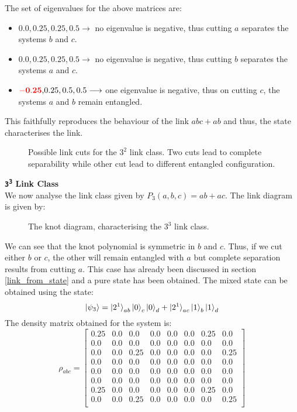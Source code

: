 \documentclass{scrartcl}
\begin{document}
    The set of eigenvalues for the above matrices are:
    \begin{itemize}
        \item $0.0, 0.25, 0.25, 0.5 \longrightarrow$ no eigenvalue is negative, thus cutting $a$ separates the systems $b$ and $c$.        
        \item $0.0, 0.25, 0.25, 0.5 \longrightarrow$ no eigenvalue is negative, thus cutting $b$ separates the systems $a$ and $c$.        
       \item $ \mathbf{\mathcolor{red}{-0.25},} 0.25, 0.5, 0.5 \longrightarrow$ one eigenvalue is negative, thus on cutting $c$, the systems $a$ and $b$ remain entangled.
    \end{itemize}
    This faithfully reproduces the behaviour of the link $abc+ab$ and thus, the state characterises the link.\begin{figure}
        \centering
        \scalebox{0.8}{ }
        \caption{Possible link cuts for the $3^2$ link class. Two cuts lead to complete separability while other cut lead to different entangled configuration.}
    \end{figure}
\textbf{\large \texttt{3\textsuperscript{3}} Link Class} \\[0.3cm]
We now analyse the link class given by $P_3(a,b,c) = ab+ac$. The link diagram is given by:
\begin{figure}[H]
    \centering
    
  \caption{The knot diagram, characterising the $3^3$ link class.}
\end{figure}
\noindent
We can see that the knot polynomial is symmetric in $b$ and $c$. Thus, if we cut either $b$ or $c$, the other will remain entangled with $a$ but complete separation results from cutting $a$. This case has already been discussed in section \ref{link_from_state} and a pure state has been obtained. The mixed state can be obtained using the state:
$$\ket{\psi_3} = \ket{2^1}_{ab}\ket{0}_c\ket{0}_d + \ket{2^1}_{ac}\ket{1}_b\ket{1}_d  $$ 
The density matrix obtained for the system is: 
\begin{equation*}
    \rho_{abc}=
    \left[
    \begin{array}{cccccccc}
    0.25 & 0.0 & 0.0 & 0.0 & 0.0 & 0.0 & 0.25 & 0.0 \\
    0.0 & 0.0 & 0.0 & 0.0 & 0.0 & 0.0 & 0.0 & 0.0 \\
    0.0 & 0.0 & 0.25 & 0.0 & 0.0 & 0.0 & 0.0 & 0.25 \\
    0.0 & 0.0 & 0.0 & 0.0 & 0.0 & 0.0 & 0.0 & 0.0 \\
    0.0 & 0.0 & 0.0 & 0.0 & 0.0 & 0.0 & 0.0 & 0.0 \\
    0.0 & 0.0 & 0.0 & 0.0 & 0.0 & 0.0 & 0.0 & 0.0 \\
    0.25 & 0.0 & 0.0 & 0.0 & 0.0 & 0.0 & 0.25 & 0.0 \\
    0.0 & 0.0 & 0.25 & 0.0 & 0.0 & 0.0 & 0.0 & 0.25 \\
    \end{array}
    \right]
    \end{equation*}
\end{document}

